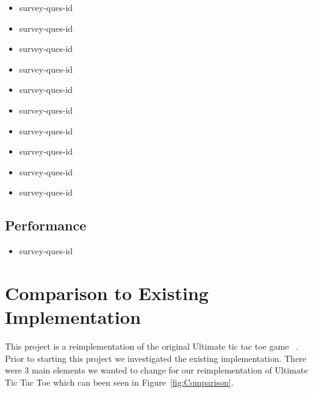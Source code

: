 \documentclass[12pt, titlepage]{article}
\newcounter{USnum}
\newcommand{\ttheUSnum}{survey-ques-id \theUSnum}
\begin{document}
\begin{itemize}

\item {\ttheUSnum \label{USq1}\\}
\item {\ttheUSnum \label{USq2}\\}
\item {\ttheUSnum \label{USq3}\\}
\item {\ttheUSnum \label{USq4}\\}
\item {\ttheUSnum \label{USq5}\\}
\item {\ttheUSnum \label{USq7}\\}
\item {\ttheUSnum \label{USq8}\\}
\item {\ttheUSnum \label{USq9}\\}
\item {\ttheUSnum \label{USq10}\\}
\item {\ttheUSnum \label{USq11}\\}

\end{itemize}
		
\subsection{Performance}
\begin{itemize}

\item {\ttheUSnum \label{USq6}\\}
\end{itemize}
	
\section{Comparison to Existing Implementation}
This project is a reimplementation of the original Ultimate tic tac toe game ~\citep{githubREF}. Prior to starting this project we investigated the existing implementation. There were 3 main elements we wanted to change for our reimplementation of Ultimate Tic Tac Toe which can been seen in Figure~\ref{fig:Comparison}.
\end{document}
